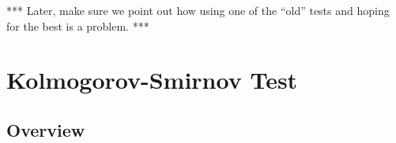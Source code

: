 *** Later, make sure we point out how using one of the ``old'' tests and
hoping for the best is a problem. ***




\section{Kolmogorov-Smirnov Test}


\subsection{Overview}


